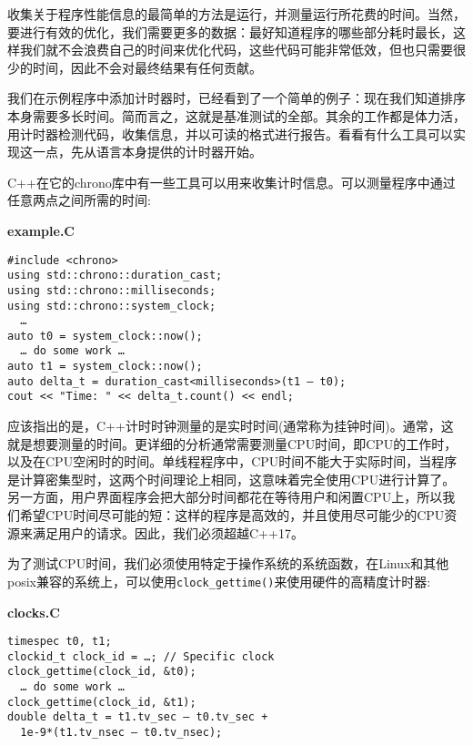 
收集关于程序性能信息的最简单的方法是运行，并测量运行所花费的时间。当然，要进行有效的优化，我们需要更多的数据：最好知道程序的哪些部分耗时最长，这样我们就不会浪费自己的时间来优化代码，这些代码可能非常低效，但也只需要很少的时间，因此不会对最终结果有任何贡献。

我们在示例程序中添加计时器时，已经看到了一个简单的例子：现在我们知道排序本身需要多长时间。简而言之，这就是基准测试的全部。其余的工作都是体力活，用计时器检测代码，收集信息，并以可读的格式进行报告。看看有什么工具可以实现这一点，先从语言本身提供的计时器开始。


C++在它的chrono库中有一些工具可以用来收集计时信息。可以测量程序中通过任意两点之间所需的时间:

\noindent
\textbf{example.C}
\begin{lstlisting}[style=styleCXX]
#include <chrono>
using std::chrono::duration_cast;
using std::chrono::milliseconds;
using std::chrono::system_clock;
  …
auto t0 = system_clock::now();
  … do some work …
auto t1 = system_clock::now();
auto delta_t = duration_cast<milliseconds>(t1 – t0);
cout << "Time: " << delta_t.count() << endl;
\end{lstlisting}

应该指出的是，C++计时时钟测量的是实时时间(通常称为挂钟时间)。通常，这就是想要测量的时间。更详细的分析通常需要测量CPU时间，即CPU的工作时，以及在CPU空闲时的时间。单线程程序中，CPU时间不能大于实际时间，当程序是计算密集型时，这两个时间理论上相同，这意味着完全使用CPU进行计算了。另一方面，用户界面程序会把大部分时间都花在等待用户和闲置CPU上，所以我们希望CPU时间尽可能的短：这样的程序是高效的，并且使用尽可能少的CPU资源来满足用户的请求。因此，我们必须超越C++17。



为了测试CPU时间，我们必须使用特定于操作系统的系统函数，在Linux和其他posix兼容的系统上，可以使用\texttt{clock\_gettime()}来使用硬件的高精度计时器:

\noindent
\textbf{clocks.C}
\begin{lstlisting}[style=styleCXX]
timespec t0, t1;
clockid_t clock_id = …; // Specific clock
clock_gettime(clock_id, &t0);
  … do some work …
clock_gettime(clock_id, &t1);
double delta_t = t1.tv_sec – t0.tv_sec +
  1e-9*(t1.tv_nsec – t0.tv_nsec);
\end{lstlisting}

